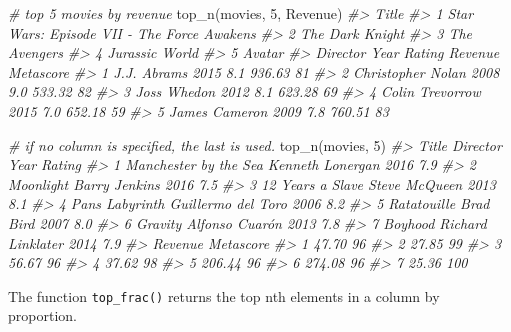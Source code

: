 \documentclass[
]{book}
\newenvironment{Shaded}{\begin{snugshade}}{\end{snugshade}}
\newcommand{\CommentTok}[1]{\textcolor[rgb]{0.56,0.35,0.01}{\textit{#1}}}
\newcommand{\DecValTok}[1]{\textcolor[rgb]{0.00,0.00,0.81}{#1}}
\newcommand{\FunctionTok}[1]{\textcolor[rgb]{0.00,0.00,0.00}{#1}}
\newcommand{\NormalTok}[1]{#1}
\begin{document}
\begin{Shaded}
\begin{Highlighting}[]
\CommentTok{\# top 5 movies by revenue}
\FunctionTok{top\_n}\NormalTok{(movies, }\DecValTok{5}\NormalTok{, Revenue)}
\CommentTok{\#\textgreater{}                                        Title}
\CommentTok{\#\textgreater{} 1 Star Wars: Episode VII {-} The Force Awakens}
\CommentTok{\#\textgreater{} 2                            The Dark Knight}
\CommentTok{\#\textgreater{} 3                               The Avengers}
\CommentTok{\#\textgreater{} 4                             Jurassic World}
\CommentTok{\#\textgreater{} 5                                     Avatar}
\CommentTok{\#\textgreater{}            Director Year Rating Revenue Metascore}
\CommentTok{\#\textgreater{} 1       J.J. Abrams 2015    8.1  936.63        81}
\CommentTok{\#\textgreater{} 2 Christopher Nolan 2008    9.0  533.32        82}
\CommentTok{\#\textgreater{} 3       Joss Whedon 2012    8.1  623.28        69}
\CommentTok{\#\textgreater{} 4   Colin Trevorrow 2015    7.0  652.18        59}
\CommentTok{\#\textgreater{} 5     James Cameron 2009    7.8  760.51        83}

\CommentTok{\# if no column is specified, the last is used.}
\FunctionTok{top\_n}\NormalTok{(movies, }\DecValTok{5}\NormalTok{)}
\CommentTok{\#\textgreater{}                   Title           Director Year Rating}
\CommentTok{\#\textgreater{} 1 Manchester by the Sea   Kenneth Lonergan 2016    7.9}
\CommentTok{\#\textgreater{} 2             Moonlight      Barry Jenkins 2016    7.5}
\CommentTok{\#\textgreater{} 3      12 Years a Slave      Steve McQueen 2013    8.1}
\CommentTok{\#\textgreater{} 4       Pan\textquotesingle{}s Labyrinth Guillermo del Toro 2006    8.2}
\CommentTok{\#\textgreater{} 5           Ratatouille          Brad Bird 2007    8.0}
\CommentTok{\#\textgreater{} 6               Gravity     Alfonso Cuarón 2013    7.8}
\CommentTok{\#\textgreater{} 7               Boyhood  Richard Linklater 2014    7.9}
\CommentTok{\#\textgreater{}   Revenue Metascore}
\CommentTok{\#\textgreater{} 1   47.70        96}
\CommentTok{\#\textgreater{} 2   27.85        99}
\CommentTok{\#\textgreater{} 3   56.67        96}
\CommentTok{\#\textgreater{} 4   37.62        98}
\CommentTok{\#\textgreater{} 5  206.44        96}
\CommentTok{\#\textgreater{} 6  274.08        96}
\CommentTok{\#\textgreater{} 7   25.36       100}
\end{Highlighting}
\end{Shaded}

The function \texttt{top\_frac()} returns the top nth elements in a column by proportion.
\end{document}
